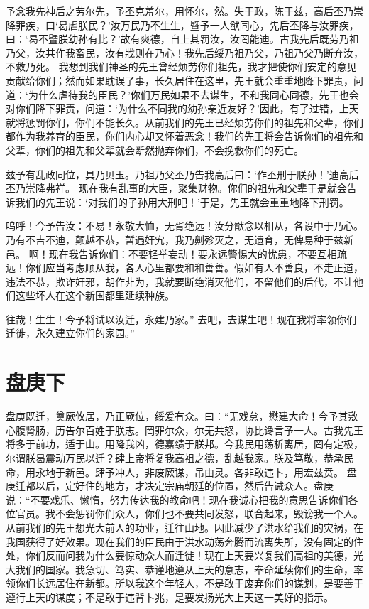 \documentclass[a4paper,12pt,UTF8,twoside]{ctexbook}
\begin{document}
予念我先神后之劳尔先，予丕克羞尔，用怀尔，然。失于政，陈于兹，高后丕乃崇降罪疾，曰‘曷虐朕民？’汝万民乃不生生，暨予一人猷同心，先后丕降与汝罪疾，曰：‘曷不暨朕幼孙有比？’故有爽德，自上其罚汝，汝罔能迪。古我先后既劳乃祖乃父，汝共作我畜民，汝有戕则在乃心！我先后绥乃祖乃父，乃祖乃父乃断弃汝，不救乃死。
我想到我们神圣的先王曾经烦劳你们祖先，我才把使你们安定的意见贡献给你们；然而如果耽误了事，长久居住在这里，先王就会重重地降下罪责，问道：‘为什么虐待我的臣民？’你们万民如果不去谋生，不和我同心同德，先王也会对你们降下罪责，问道：‘为什么不同我的幼孙亲近友好？’因此，有了过错，上天就将惩罚你们，你们不能长久。从前我们的先王已经烦劳你们的祖先和父辈，你们都作为我养育的臣民，你们内心却又怀着恶念！我们的先王将会告诉你们的祖先和父辈，你们的祖先和父辈就会断然抛弃你们，不会挽救你们的死亡。

兹予有乱政同位，具乃贝玉。乃祖乃父丕乃告我高后曰：‘作丕刑于朕孙！’迪高后丕乃崇降弗祥。
现在我有乱事的大臣，聚集财物。你们的祖先和父辈于是就会告诉我们的先王说：‘对我们的子孙用大刑吧！’于是，先王就会重重地降下刑罚。

呜呼！今予告汝：不易！永敬大恤，无胥绝远！汝分猷念以相从，各设中于乃心。乃有不吉不迪，颠越不恭，暂遇奸宄，我乃劓殄灭之，无遗育，无俾易种于兹新邑。
啊！现在我告诉你们：不要轻举妄动！要永远警惕大的忧患，不要互相疏远！你们应当考虑顺从我，各人心里都要和和善善。假如有人不善良，不走正道，违法不恭，欺诈奸邪，胡作非为，我就要断绝消灭他们，不留他们的后代，不让他们这些坏人在这个新国都里延续种族。

往哉！生生！今予将试以汝迁，永建乃家。”
去吧，去谋生吧！现在我将率领你们迁徙，永久建立你们的家园。”

\chapter{盘庚下}

盘庚既迁，奠厥攸居，乃正厥位，绥爰有众。曰：“无戏怠，懋建大命！今予其敷心腹肾肠，历告尔百姓于朕志。罔罪尔众，尔无共怒，协比谗言予一人。古我先王将多于前功，适于山。用降我凶，德嘉绩于朕邦。今我民用荡析离居，罔有定极，尔谓朕曷震动万民以迁？肆上帝将复我高祖之德，乱越我家。朕及笃敬，恭承民命，用永地于新邑。肆予冲人，非废厥谋，吊由灵。各非敢违卜，用宏兹贲。
盘庚迁都以后，定好住的地方，才决定宗庙朝廷的位置，然后告诫众人。盘庚说：“不要戏乐、懒惰，努力传达我的教命吧！现在我诚心把我的意思告诉你们各位官员。我不会惩罚你们众人，你们也不要共同发怒，联合起来，毁谤我一个人。从前我们的先王想光大前人的功业，迁往山地。因此减少了洪水给我们的灾祸，在我国获得了好效果。现在我们的臣民由于洪水动荡奔腾而流离失所，没有固定的住处，你们反而问我为什么要惊动众人而迁徙！现在上天要兴复我们高祖的美德，光大我们的国家。我急切、笃实、恭谨地遵从上天的意志，奉命延续你们的生命，率领你们长远居住在新都。所以我这个年轻人，不是敢于废弃你们的谋划，是要善于遵行上天的谋度；不是敢于违背卜兆，是要发扬光大上天这一美好的指示。
\end{document}
